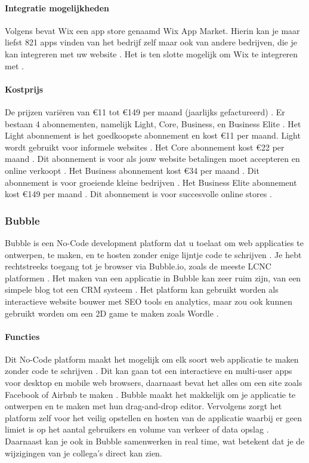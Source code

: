 \paragraph{Integratie mogelijkheden}
Volgens \textcite{Singleton2024} bevat Wix een app store genaamd Wix App Market. 
Hierin kan je maar liefst 821 apps vinden van het bedrijf zelf maar ook van andere bedrijven, die je kan integreren met uw website \autocite{Singleton2024}.
Het is ten slotte mogelijk om Wix te integreren met  \textcite{MAKE.com2024a}.

\paragraph{Kostprijs}
De prijzen variëren van €11 tot €149 per maand (jaarlijks gefactureerd) \autocite{Wix2024} \autocite{Ryan2024}. 
Er bestaan 4 abonnementen, namelijk Light, Core, Business, en Business Elite \autocite{Wix2024}.
Het Light abonnement is het goedkoopste abonnement en kost €11 per maand. Light wordt gebruikt voor informele websites \autocite{Ryan2024}.
Het Core abonnement kost €22 per maand \autocite{Wix2024}. Dit abonnement is voor als jouw website betalingen moet accepteren en online verkoopt \autocite{Ryan2024}.
Het Business abonnement kost €34 per maand \autocite{Wix2024}. Dit abonnement is voor groeiende kleine bedrijven \autocite{Ryan2024}.
Het Business Elite abonnement kost €149 per maand \autocite{Wix2024}. Dit abonnement is voor succesvolle online stores \autocite{Ryan2024}.
\subsubsection*{Bubble}
Bubble is een No-Code development platform dat u toelaat om web applicaties te ontwerpen, te maken, en te hosten zonder enige lijntje code te schrijven \autocite{Sharma2022}.
Je hebt rechtstreeks toegang tot je browser via Bubble.io, zoals de meeste LCNC platformen \autocite{Minor2022}. Het maken van een applicatie in Bubble kan zeer ruim zijn, van een simpele blog tot een CRM systeem \autocite{Sharma2022}.
Het platform kan gebruikt worden als interactieve website bouwer met SEO tools en analytics, maar zou ook kunnen gebruikt worden om een 2D game te maken zoals Wordle \autocite{Minor2022}.

\paragraph{Functies}
Dit No-Code platform maakt het mogelijk om elk soort web applicatie te maken zonder code te schrijven \autocite{Bubble2024b}.
Dit kan gaan tot een interactieve en multi-user apps voor desktop en mobile web browsers, daarnaast bevat het alles om een site zoals Facebook of Airbnb te maken \autocite{Bubble2024b}.
Bubble maakt het makkelijk om je applicatie te ontwerpen en te maken met hun drag-and-drop editor.
Vervolgens zorgt het platform zelf voor het veilig opstellen en hosten van de applicatie waarbij er geen limiet is op het aantal gebruikers en volume van verkeer of data opslag \autocite{Bubble2024b}.
Daarnaast kan je ook in Bubble samenwerken in real time, wat betekent dat je de wijzigingen van je collega's direct kan zien.
